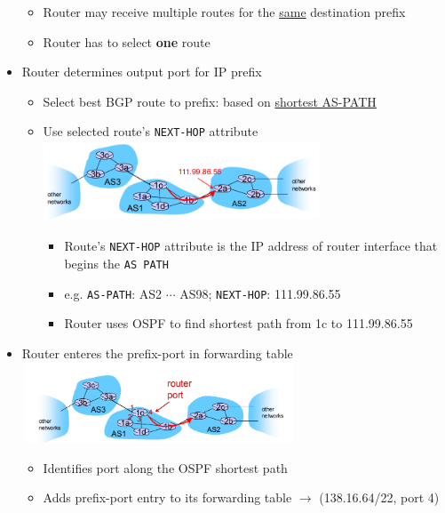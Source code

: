 \documentclass[10pt,landscape]{article}
\begin{document}
\begin{multicols*}{3}
\begin{itemize}[topsep=0pt,noitemsep,wide=0pt, leftmargin=\dimexpr{} + 2\relax]
\begin{itemize}[topsep=0pt,noitemsep,wide=0pt, leftmargin=\dimexpr{} + 2\relax]
    \item Router may receive multiple routes for the \underline{same} destination prefix
    \item Router has to select \textbf{one} route
  \end{itemize}
  \item Router determines output port for IP prefix
  \begin{itemize}[topsep=0pt,noitemsep,wide=0pt, leftmargin=\dimexpr{} + 2\relax]
    \item Select best BGP route to prefix: based on \underline{shortest AS-PATH}
    \item Use selected route's \verb|NEXT-HOP| attribute
    \includegraphics*[width=8.2cm, height=2.4cm]{images/prefix3.png}
    \begin{itemize}[topsep=0pt,noitemsep,wide=0pt, leftmargin=\dimexpr{} + 2\relax]
      \item Route's \verb|NEXT-HOP| attribute is the IP address of router interface that begins the \verb|AS PATH|
      \item e.g. \verb|AS-PATH|: AS2 $\cdots$ AS98; \verb|NEXT-HOP|: 111.99.86.55
      \item Router uses OSPF to find shortest path from 1c to 111.99.86.55
    \end{itemize}
  \end{itemize}
  \item Router enteres the prefix-port in forwarding table
  \includegraphics*[width=8.2cm, height=2.4cm]{images/prefix4.png}
  \begin{itemize}[topsep=0pt,noitemsep,wide=0pt, leftmargin=\dimexpr{} + 2\relax]
    \item Identifies port along the OSPF shortest path
    \item Adds prefix-port entry to its forwarding table $\rightarrow$ (138.16.64/22, port 4)
  \end{itemize}
\end{itemize}


\end{multicols*}
\end{document}

